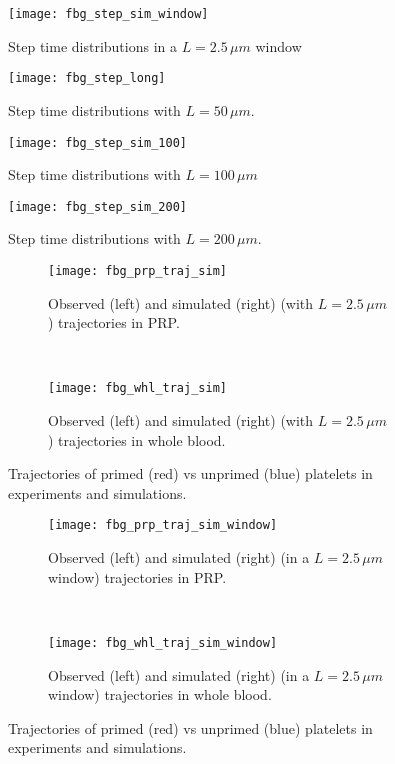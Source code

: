 \documentclass{article}
\begin{document}
\begin{figure}
  \centering
  \texttt{[image: fbg\_step\_sim\_window]}
  \caption{Step time distributions in a $L = 2.5 \, \mu m$ window}
  \label{fig:step-time-window}
\end{figure}

\begin{figure}
  \centering
  \texttt{[image: fbg\_step\_long]}
  \caption{Step time distributions with $L = 50 \, \mu m$.}
  \label{fig:step-time-long}
\end{figure}

\begin{figure}
  \centering
  \texttt{[image: fbg\_step\_sim\_100]}
  \caption{Step time distributions with $L = 100 \, \mu m$}
  \label{fig:step-time-100}
\end{figure}

\begin{figure}
  \centering
  \texttt{[image: fbg\_step\_sim\_200]}
  \caption{Step time distributions with $L = 200 \, \mu m$.}
  \label{fig:step-time-200}
\end{figure}

\begin{figure}
  \centering
  \begin{subfigure}{\textwidth}
    \texttt{[image: fbg\_prp\_traj\_sim]}
    \caption{Observed (left) and simulated (right) (with $L=2.5 \, \mu m$)
      trajectories in PRP.}
  \end{subfigure}
  \\
  \begin{subfigure}{\textwidth}
    \texttt{[image: fbg\_whl\_traj\_sim]}
    \caption{Observed (left) and simulated (right) (with $L=2.5 \, \mu m$)
      trajectories in whole blood.}
  \end{subfigure}
  \caption{Trajectories of primed (red) vs unprimed (blue) platelets
    in experiments and simulations.}
  \label{fig:traj-plots}
\end{figure}

\begin{figure}
  \centering
  \begin{subfigure}{\textwidth}
    \texttt{[image: fbg\_prp\_traj\_sim\_window]}
    \caption{Observed (left) and simulated (right) (in a
      $L=2.5 \, \mu m$ window) trajectories in PRP.}
  \end{subfigure}
  \\
  \begin{subfigure}{\textwidth}
    \texttt{[image: fbg\_whl\_traj\_sim\_window]}
    \caption{Observed (left) and simulated (right) (in a
      $L=2.5 \, \mu m$ window) trajectories in whole blood.}
  \end{subfigure}
  \caption{Trajectories of primed (red) vs unprimed (blue) platelets
    in experiments and simulations.}
  \label{fig:traj-plots-window}
\end{figure}
\end{document}
